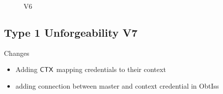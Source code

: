 \begin{figure}
\begin{pchstack}[boxed, center, space=1em]
{    }
    \begin{pcvstack}
    \end{pcvstack}
\end{pchstack}
  \caption{V6 }
  \label{fig:prf}
\end{figure}




\newpage
\subsection{Type 1 Unforgeability V7}
Changes
\begin{itemize}
    \item Adding $\mathsf{CTX}$ mapping credentials to their context
    \item adding connection between master and context credential in ObtIss
\end{itemize}

